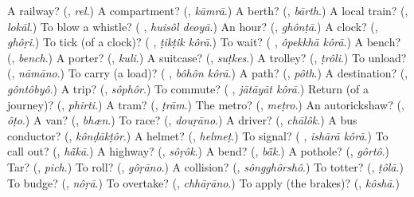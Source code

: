 \begin{tcolorbox}[breakable,colback=teal!4,colframe=teal!35!black,title={Before you move on}]
A railway? (\textbf{}, \emph{rel}.) A compartment? (\textbf{}, \emph{kāmrā}.) A berth? (\textbf{}, \emph{bārth}.) A local train? (\textbf{}, \emph{lokāl}.) To blow a whistle? (\textbf{ }, \emph{huisôl deoyā}.) An hour? (\textbf{}, \emph{ghônṭā}.) A clock? (\textbf{}, \emph{ghôṛi}.) To tick (of a clock)? (\textbf{ }, \emph{ṭikṭik kôrā}.) To wait? (\textbf{ }, \emph{ôpekkhā kôrā}.) A bench? (\textbf{}, \emph{bench}.) A porter? (\textbf{}, \emph{kuli}.) A suitcase? (\textbf{}, \emph{suṭkes}.) A trolley? (\textbf{}, \emph{ṭrôli}.) To unload? (\textbf{}, \emph{nāmāno}.) To carry (a load)? (\textbf{ }, \emph{bôhôn kôrā}.) A path? (\textbf{}, \emph{pôth}.) A destination? (\textbf{}, \emph{gôntôbyô}.) A trip? (\textbf{}, \emph{sôphôr}.) To commute? (\textbf{ }, \emph{jātāyāt kôrā}.) Return (of a journey)? (\textbf{}, \emph{phirti}.) A tram? (\textbf{}, \emph{ṭrām}.) The metro? (\textbf{}, \emph{meṭro}.) An autorickshaw? (\textbf{}, \emph{ôṭo}.) A van? (\textbf{}, \emph{bhæn}.) To race? (\textbf{}, \emph{douṛāno}.) A driver? (\textbf{}, \emph{chālôk}.) A bus conductor? (\textbf{}, \emph{kônḍākṭôr}.) A helmet? (\textbf{}, \emph{helmeṭ}.) To signal? (\textbf{ }, \emph{ishārā kôrā}.) To call out? (\textbf{}, \emph{hā̃kā}.) A highway? (\textbf{}, \emph{sôṛôk}.) A bend? (\textbf{}, \emph{bā̃k}.) A pothole? (\textbf{}, \emph{gôrtô}.) Tar? (\textbf{}, \emph{pich}.) To roll? (\textbf{}, \emph{gôṛāno}.) A collision? (\textbf{}, \emph{sôngghôrshô}.) To totter? (\textbf{}, \emph{ṭôlā}.) To budge? (\textbf{}, \emph{nôṛā}.) To overtake? (\textbf{}, \emph{chhāṛāno}.) To apply (the brakes)? (\textbf{}, \emph{kôshā}.)
\end{tcolorbox}
